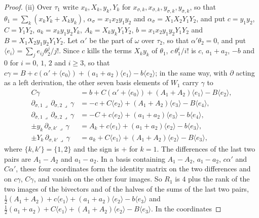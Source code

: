 \documentclass[11pt,reqno]{amsart}
\theoremstyle{plain}
\theoremstyle{definition}
\theoremstyle{remark}
\newcommand{\bbar}[1]{\overline{#1}}
\begin{document}
\begin{proof}
(ii) Over $\tau_{1}$ write $x_{k},X_{k},y_{k},Y_{k}$ for $x_{\sigma,k},
x_{\bbar\sigma,k},y_{\sigma,k},y_{\bbar\sigma,k}$, so that
$\theta_{1}=\sum_{k}(x_{k}Y_{k}+X_{k}y_{k})$, $\alpha_{\sigma}=x_{1}x_{2}y_{1}y_{2}$
and $\alpha_{\bbar\sigma}=X_{1}X_{2}Y_{1}Y_{2}$, and put $c=y_{1}y_{2}$,
$C=Y_{1}Y_{2}$, $a_{k}=x_{k}y_{1}y_{2}Y_{k}$, $A_{k}=X_{k}y_{k}Y_{1}Y_{2}$,
$b=x_{1}x_{2}y_{1}y_{2}Y_{1}Y_{2}$ and $B=X_{1}X_{2}y_{1}y_{2}Y_{1}Y_{2}$. Let
$\alpha'$ be the part of $\omega$ over $\tau_{2}$, so that $\alpha'\theta_{2}=0$,
and put $\langle e_{i}\rangle=\sum_{j}e_{ij}\theta_{2}^{j}/j!$. Since $c$ kills
the terms $X_{k}y_{k}$ of $\theta_{1}$, $c\,\theta_{1}^{i}/i!$ is $c$,
$a_{1}+a_{2}$, $-b$ and $0$ for $i=0$, $1$, $2$ and $i\ge3$, so that
$c\gamma=B+c(\alpha'+\langle e_{0}\rangle)+(a_{1}+a_{2})\langle e_{1}\rangle
-b\langle e_{2}\rangle$; in the same way, with $\partial$ acting as a left
derivation, the other seven basis elements of $W_{1}$ carry $\gamma$ to
\begin{align*}
  C\gamma&=b+C(\alpha'+\langle e_{0}\rangle)+(A_{1}+A_{2})\langle e_{1}\rangle
    -B\langle e_{2}\rangle,\\
  \partial_{\sigma,1}\lrcorner\,\partial_{\sigma,2}\lrcorner\,\gamma&=
    -c+C\langle e_{2}\rangle+(A_{1}+A_{2})\langle e_{3}\rangle-B\langle e_{4}\rangle,\\
  \partial_{\bbar\sigma,1}\lrcorner\,\partial_{\bbar\sigma,2}\lrcorner\,\gamma&=
    -C+c\langle e_{2}\rangle+(a_{1}+a_{2})\langle e_{3}\rangle-b\langle e_{4}\rangle,\\
  \pm y_{k}\,\partial_{\bbar\sigma,k'}\lrcorner\,\gamma&=
    A_{k}+c\langle e_{1}\rangle+(a_{1}+a_{2})\langle e_{2}\rangle-b\langle e_{3}\rangle,\\
  \pm Y_{k}\,\partial_{\sigma,k'}\lrcorner\,\gamma&=
    a_{k}+C\langle e_{1}\rangle+(A_{1}+A_{2})\langle e_{2}\rangle-B\langle e_{3}\rangle,
\end{align*}
where $\{k,k'\}=\{1,2\}$ and the sign is $+$ for $k=1$. The differences of
the last two pairs are $A_{1}-A_{2}$ and $a_{1}-a_{2}$. In a basis containing
$A_{1}-A_{2}$, $a_{1}-a_{2}$, $c\alpha'$ and $C\alpha'$, these four
coordinates form the identity matrix on the two differences and on $c\gamma$,
$C\gamma$, and vanish on the other four images. So $R_{1}$ is $4$ plus the rank of the two
images of the bivectors and of the halves of the sums of the last two pairs,
$\tfrac12(A_{1}+A_{2})+c\langle e_{1}\rangle+(a_{1}+a_{2})\langle e_{2}\rangle
-b\langle e_{3}\rangle$ and $\tfrac12(a_{1}+a_{2})+C\langle e_{1}\rangle+
(A_{1}+A_{2})\langle e_{2}\rangle-B\langle e_{3}\rangle$. In the coordinates

\end{proof}
\end{document}
